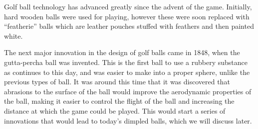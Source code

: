 Golf ball technology has advanced greatly since the advent of the game. Initially, hard wooden
balls were used for playing, however these were soon replaced with “featherie” balls which are
leather pouches stuffed with feathers and then painted white.

The next major innovation in the design of golf balls came in 1848, when the gutta-percha
ball was invented. This is the first ball to use a rubbery substance as continues to this day,
and was easier to make into a proper sphere, unlike the previous types of ball. It was around
this time that it was discovered that abrasions to the surface of the ball would improve the
aerodynamic properties of the ball, making it easier to control the flight of the ball and increasing
the distance at which the game could be played. This would start a series of innovations that
would lead to today’s dimpled balls, which we will discuss later.


